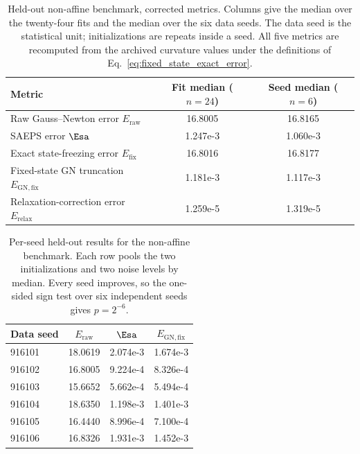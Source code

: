 \begin{table}[!htbp]
\centering
\caption{Held-out non-affine benchmark, corrected metrics.
Columns give the median over the twenty-four fits and the median over the six data seeds.
The data seed is the statistical unit; initializations are repeats inside a seed.
All five metrics are recomputed from the archived curvature values under the definitions of Eq.~\eqref{eq:fixed_state_exact_error}.}
\label{tab:e3_heldout}
\footnotesize
\setlength{\tabcolsep}{4pt}
\begin{tabular}{lcc}
\toprule
Metric & Fit median ($n=24$) & Seed median ($n=6$) \\
\midrule
Raw Gauss--Newton error $E_{\mathrm{raw}}$ & 16.8005 & 16.8165 \\
SAEPS error $\Esa$ & 1.247e-3 & 1.060e-3 \\
Exact state-freezing error $E_{\mathrm{fix}}$ & 16.8016 & 16.8177 \\
Fixed-state GN truncation $E_{\mathrm{GN,fix}}$ & 1.181e-3 & 1.117e-3 \\
Relaxation-correction error $E_{\mathrm{relax}}$ & 1.259e-5 & 1.319e-5 \\
\bottomrule
\end{tabular}
\end{table}
\begin{table}[!htbp]
\centering
\caption{Per-seed held-out results for the non-affine benchmark.
Each row pools the two initializations and two noise levels by median.
Every seed improves, so the one-sided sign test over six independent seeds gives $p=2^{-6}$.}
\label{tab:e3_seeds}
\footnotesize
\setlength{\tabcolsep}{4pt}
\begin{tabular}{lccc}
\toprule
Data seed & $E_{\mathrm{raw}}$ & $\Esa$ & $E_{\mathrm{GN,fix}}$ \\
\midrule
916101 & 18.0619 & 2.074e-3 & 1.674e-3 \\
916102 & 16.8005 & 9.224e-4 & 8.326e-4 \\
916103 & 15.6652 & 5.662e-4 & 5.494e-4 \\
916104 & 18.6350 & 1.198e-3 & 1.401e-3 \\
916105 & 16.4440 & 8.996e-4 & 7.100e-4 \\
916106 & 16.8326 & 1.931e-3 & 1.452e-3 \\
\bottomrule
\end{tabular}
\end{table}
